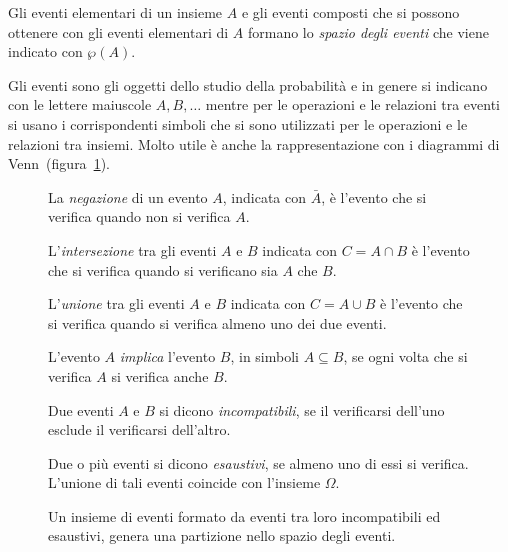 Gli eventi elementari di un insieme $A$ e gli eventi composti che si possono 
ottenere con gli eventi elementari di $A$ formano lo \emph{spazio degli eventi} 
che viene indicato con $\wp (A)$.

Gli eventi sono gli oggetti dello studio della probabilità e in genere si 
indicano con le lettere maiuscole $A,B,\ldots $ mentre per le operazioni e le 
relazioni tra eventi si usano i corrispondenti simboli che si sono utilizzati 
per le operazioni e le relazioni tra insiemi. Molto utile è anche la 
rappresentazione con i diagrammi di Venn~(figura~\ref{fig:9.1}).
\begin{inaccessibleblock}
 \begin{figure}[tp]
\begin{minipage}[t]{.45\textwidth}
\centering
\caption{La \emph{negazione} di un evento $A$, indicata con $\bar {A}$, è 
l'evento che si verifica quando non si verifica $A$.}\label{fig:9.1}
\end{minipage}\hfil
\begin{minipage}[t]{.45\textwidth}
\centering
\caption{L'\emph{intersezione} tra gli eventi $A$ e $B$ indicata con $C=A\cap 
B$ 
è l'evento che si verifica quando si verificano sia $A$ che $B$.}
\end{minipage}
\vspace{5px}
\begin{minipage}[t]{.45\textwidth}
\centering
\caption{L'\emph{unione} tra gli eventi $A$ e $B$ indicata con $C=A\cup B$ è 
l'evento che si verifica quando si verifica almeno uno dei due eventi.}
\end{minipage}\hfil
\begin{minipage}[t]{.45\textwidth}
\centering
\caption{L'evento $A$ \emph{implica} l'evento $B$, in simboli $ A \subseteq B$, 
se ogni volta che si verifica $A$ si verifica anche $B$.}
\end{minipage}
\vspace{5px}
\begin{minipage}[t]{.45\textwidth}
\centering
\caption{Due eventi $A$ e $B$ si dicono \emph{incompatibili}, se il verificarsi 
dell'uno esclude il verificarsi dell'altro.}
\end{minipage}\hfil
\begin{minipage}[t]{.45\textwidth}
\centering
\caption{Due o più eventi si dicono \emph{esaustivi}, se almeno uno di essi si 
verifica. L'unione di tali eventi coincide con l'insieme $\Omega$.}
\end{minipage}
\vspace{5px}
\begin{minipage}[t]{.90\textwidth}
\centering
\caption{Un insieme di eventi formato da eventi tra loro incompatibili ed 
esaustivi, genera una partizione nello spazio degli eventi.}
\end{minipage}\hfil
\end{figure}
\end{inaccessibleblock}

